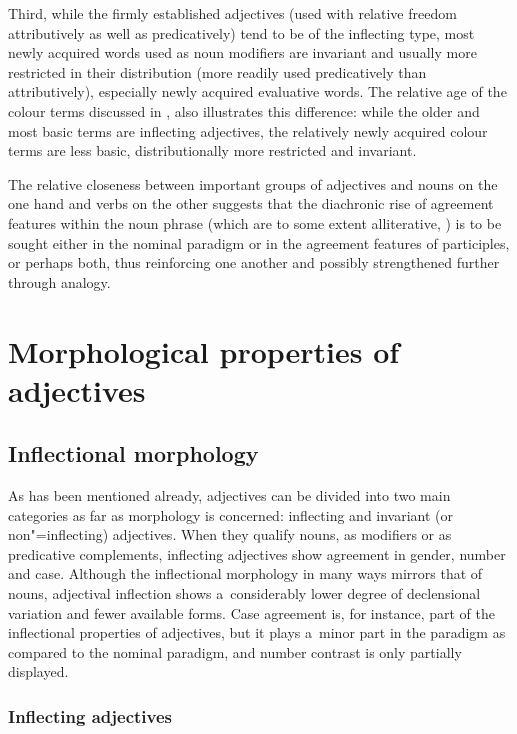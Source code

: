 Third, while the firmly established adjectives (used with relative freedom attributively as well as predicatively) tend to be of the inflecting type, most newly acquired words used as noun modifiers are invariant and usually more restricted in their distribution (more readily used predicatively than attributively), especially newly acquired evaluative words. The relative age of the colour terms discussed in , also illustrates this difference: while the older and most basic terms are inflecting adjectives, the relatively newly acquired colour terms are less basic, distributionally more restricted and invariant.



The relative closeness between important groups of adjectives and nouns on the one hand and verbs on the other suggests that the diachronic rise of agreement features within the noun phrase (which are to some extent alliterative, \citealt[87]{corbett2006}) is to be sought either in the nominal paradigm or in the agreement features of participles, or perhaps both, thus reinforcing one another and possibly strengthened further through analogy.


\section{Morphological properties of adjectives}
\label{sec:6-3}

\subsection{Inflectional morphology}
\label{subsec:6-3-1}

As has been mentioned already, adjectives can be divided into two main categories as far as morphology is concerned: inflecting and invariant (or non"=inflecting) adjectives. When they qualify nouns, as modifiers or as predicative complements, inflecting adjectives show agreement in gender, number and case. Although the inflectional morphology in many ways mirrors that of nouns, adjectival inflection shows a~considerably lower degree of declensional variation and fewer available forms. Case agreement is, for instance, part of the inflectional properties of adjectives, but it plays a~minor part in the paradigm as compared to the nominal paradigm, and number contrast is only partially displayed.

\subsubsection*{Inflecting adjectives}

